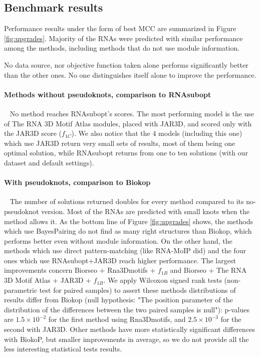 \documentclass{bioinfo}
\begin{document}
\subsection{Benchmark results}
Performance results under the form of best MCC are summarized in Figure \ref{fig:upgrades}.
Majority of the RNAs were predicted with similar performance among the methods, including methods that do not use module information. 

No data source, nor objective function taken alone performs significantly better than the other ones. No one distinguishes itself alone to improve the performance. 

\paragraph{Methods without pseudoknots, comparison to RNAsubopt} ~ No method reaches RNAsubopt's scores. The most performing model is the use of The RNA 3D Motif Atlas modules, placed with JAR3D, and scored only with the JAR3D score ($f_{1C}$). We also notice that the 4 models (including this one) which use JAR3D return very small sets of results, most of them being one optimal solution, while RNAsubopt returns from one to ten solutions (with our dataset and default settings).

\paragraph{With pseudoknots, comparison to Biokop} ~ The number of solutions returned doubles for every method compared to its no-pseudoknot version. Most of the RNAs are predicted with small knots when the method allows it. As the bottom line of Figure \ref{fig:upgrades} shows, the methods which use BayesPairing do not find as many right structures than  Biokop, which performs better even without module information. On the other hand, the methods which use direct pattern-matching (like RNA-MoIP did) and the four ones which use RNAsubopt+JAR3D reach higher performance. The largest improvements concern Biorseo + Rna3Dmotifs + $f_{1B}$ and Biorseo + The RNA 3D Motif Atlas + JAR3D + $f_{1B}$. We apply Wilcoxon signed rank tests (non-parametric test for paired samples) to assert these methods distributions of results differ from Biokop (null hypothesis: "The position parameter of the distribution of the differences between the two paired samples is null"): p-values are $1.5\times 10^{-2}$ for the first method using Rna3Dmotifs, and $2.5\times 10^{-3}$ for the second with JAR3D. Other methods have more statistically significant differences with BiokoP, but smaller improvements in average, so we do not provide all the less interesting statistical tests results.
\end{document}
